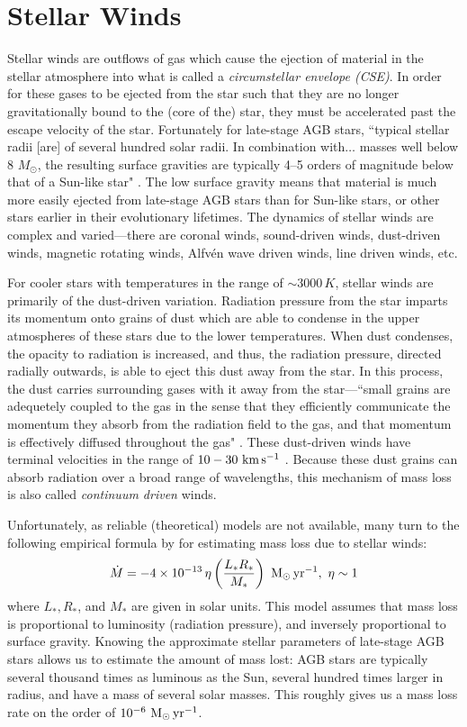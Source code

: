 \documentclass[twocolumn]{aastex63}
\begin{document}
\section{Stellar Winds} \label{sec:winds}

Stellar winds are outflows of gas which cause the ejection of material in the stellar atmosphere into what is called a \textit{circumstellar envelope (CSE)}. In order for these gases to be ejected from the star such that they are no longer gravitationally bound to the (core of the) star, they must be accelerated past the escape velocity of the star. Fortunately for late-stage AGB stars, ``typical stellar radii [are] of several hundred solar radii. In combination with$\ldots$ masses well below 8 $M_\odot$, the resulting surface gravities are typically 4–5 orders of magnitude below that of a Sun-like star" \citep{hofner}. The low surface gravity means that material is much more easily ejected from late-stage AGB stars than for Sun-like stars, or other stars earlier in their evolutionary lifetimes. The dynamics of stellar winds are complex and varied—there are coronal winds, sound-driven winds, dust-driven winds, magnetic rotating winds, Alfv\'en wave driven winds, line driven winds, etc. \citep{lamers}

For cooler stars with temperatures in the range of $\sim 3000\,K$, stellar winds are primarily of the dust-driven variation. Radiation pressure from the star imparts its momentum onto grains of dust which are able to condense in the upper atmospheres of these stars due to the lower temperatures. When dust condenses, the opacity to radiation is increased, and thus, the radiation pressure, directed radially outwards, is able to eject this dust away from the star. In this process, the dust carries surrounding gases with it away from the star—``small grains are adequetely coupled to the gas in the sense that they efficiently communicate the momentum they absorb from the radiation field to the gas, and that momentum is effectively diffused throughout the gas" \citep{gilman}. These dust-driven winds have terminal velocities in the range of $10-30~{\rm km\,s^{-1}}$ \citep{lamers}. Because these dust grains can absorb radiation over a broad range of wavelengths, this mechanism of mass loss is also called \textit{continuum driven} winds. 


Unfortunately, as reliable (theoretical) models are not available, many turn to the following empirical formula by \cite{reimers} for estimating mass loss due to stellar winds:
\begin{equation*}
    \dot M = -4\times 10^{-13}\,\eta \left(\frac{L_*R_*}{M_*}\right)~{\rm M_\odot\,yr^{-1}},~{\rm \eta \sim 1}
\end{equation*}
where $L_*, R_*$, and $M_*$ are given in solar units. This model assumes that mass loss is proportional to luminosity (radiation pressure), and inversely proportional to surface gravity. Knowing the approximate stellar parameters of late-stage AGB stars allows us to estimate the amount of mass lost: AGB stars are typically several thousand times as luminous as the Sun, several hundred times larger in radius, and have a mass of several solar masses. This roughly gives us a mass loss rate on the order of $10^{-6}~{\rm M_\odot\,yr^{-1}}$.
\end{document}
